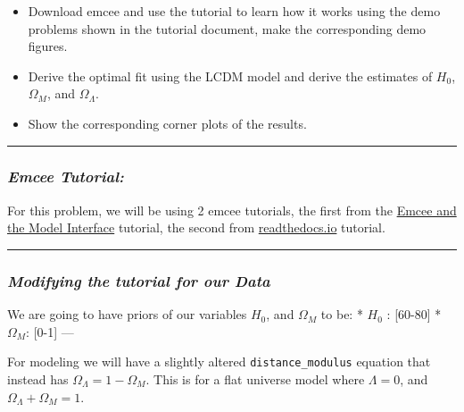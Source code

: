 \documentclass[11pt]{article}
\providecommand{\tightlist}{%
      \setlength{\itemsep}{0pt}\setlength{\parskip}{0pt}}
\begin{document}
\begin{itemize}
\tightlist
\item
  Download emcee and use the tutorial to learn how it works using the
  demo problems shown in the tutorial document, make the corresponding
  demo figures.
\item
  Derive the optimal fit using the LCDM model and derive the estimates
  of \(H_0\), \(\Omega_M\), and \(\Omega_\Lambda\).
\item
  Show the corresponding corner plots of the results.
\end{itemize}

\begin{center}\rule{0.5\linewidth}{0.5pt}\end{center}

    \hypertarget{emcee-tutorial}{%
\subsubsection{\texorpdfstring{\emph{Emcee
Tutorial:}}{Emcee Tutorial:}}\label{emcee-tutorial}}

For this problem, we will be using 2 emcee tutorials, the first from the
\href{https://lmfit.github.io/lmfit-py/examples/example_emcee_Model_interface.html}{Emcee
and the Model Interface} tutorial, the second from
\href{https://emcee.readthedocs.io/en/stable/tutorials/line/}{readthedocs.io}
tutorial.

\begin{center}\rule{0.5\linewidth}{0.5pt}\end{center}

    \hypertarget{modifying-the-tutorial-for-our-data}{%
\subsubsection{\texorpdfstring{\emph{Modifying the tutorial for our
Data}}{Modifying the tutorial for our Data}}\label{modifying-the-tutorial-for-our-data}}

We are going to have priors of our variables \(H_0\), and \(\Omega_M\)
to be: * \(H_0\) : {[}60-80{]} * \(\Omega_M\): {[}0-1{]} ---

For modeling we will have a slightly altered \texttt{distance\_modulus}
equation that instead has \(\Omega_\Lambda = 1 - \Omega_M\). This is for
a flat universe model where \(\Lambda = 0\), and
\(\Omega_\Lambda + \Omega_M = 1\).
\end{document}
